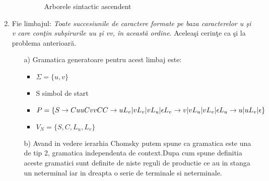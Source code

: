\begin{enumerate}
\begin{enumerate}
\begin{figure}[h!]
\caption{Arborele sintactic ascendent}
\end{figure}

\end{enumerate}

\item
Fie limbajul: \textit{Toate succesiunile de caractere formate pe baza caracterelor u şi v care conţin subşirurile uu şi vv, în această ordine}. Aceleaşi cerinţe ca şi la problema anterioară.

\begin{enumerate}
\item[a)]
Gramatica generatoare pentru acest limbaj este:
\begin{itemize}
\item $\Sigma = \{ u,v\}$
\item S simbol de start
\item $P=\{ S\rightarrow CuuCvvC \newline 
C\rightarrow uL_{v}|vL_{v}|vL_{u}|\epsilon \newline
L_{v}\rightarrow v|vL_{u}|vL_{v}|\epsilon \newline
L_{u}\rightarrow u|uL_{v}|\epsilon \}$
\item $V_{N}=\{S, C, L_{u}, L_{v}\}$
\end{itemize}

\item[b)]
Avand in vedere ierarhia Chomsky putem spune ca gramatica este una de tip 2, gramatica independenta de context.Dupa cum spune definitia aceste gramatici sunt definite de niste reguli de productie ce au in stanga un neterminal iar in dreapta o serie de terminale si neterminale.


\end{enumerate}
\end{enumerate}
